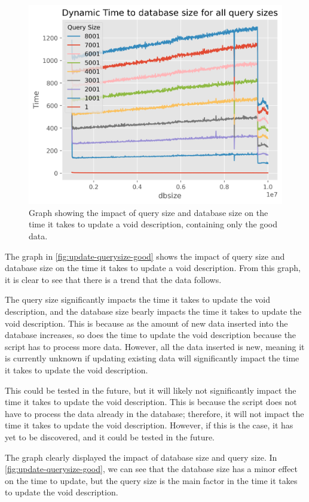 \begin{figure}[htb!]
    \centering
    \includegraphics[width=0.8\columnwidth]{figures/dynamic-time-query-size-good.png}
    \caption{Graph showing the impact of query size and database size on the time it takes to update a \gls{void} description, containing only the good data.}
    \label{fig:update-querysize-good}
\end{figure}


The graph in \autoref{fig:update-querysize-good} shows the impact of query size and database size on the time it takes to update a \gls{void} description. From this graph, it is clear to see that there is a trend that the data follows.

The query size significantly impacts the time it takes to update the \gls{void} description, and the database size bearly impacts the time it takes to update the \gls{void} description. This is because as the amount of new data inserted into the database increases, so does the time to update the \gls{void} description because the script has to process more data. However, all the data inserted is new, meaning it is currently unknown if updating existing data will significantly impact the time it takes to update the \gls{void} description.

This could be tested in the future, but it will likely not significantly impact the time it takes to update the \gls{void} description. This is because the script does not have to process the data already in the database; therefore, it will not impact the time it takes to update the \gls{void} description. However, if this is the case, it has yet to be discovered, and it could be tested in the future.

The graph clearly displayed the impact of database size and query size. In \autoref{fig:update-querysize-good}, we can see that the database size has a minor effect on the time to update, but the query size is the main factor in the time it takes to update the \gls{void} description.

